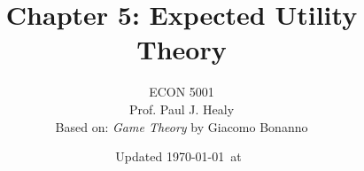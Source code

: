 

\title[Expected Utility]{Chapter 5: Expected Utility Theory}
\author[ECON 5001]{ECON 5001\\Prof. Paul J. Healy\\Based on: \textit{Game Theory} by Giacomo Bonanno} \color{metrop}
\institute[OSU]{}
\date[]{\vfill {\tiny Updated \today\ at\ \DTMcurrenttime}}

%
%

\newcommand{\riskpanel}[3]{%
  \draw[->] (7,0) -- (25.5,0) node[below] {\scriptsize \$};
  \draw[->] (7,0) -- (7,6.2) node[left] {\scriptsize $u$};
  \draw[blue, very thick, smooth, samples=80, domain=#2] plot (\x,{#1});
  \draw[thick] (10,1.64) -- (20,4.33);
  \foreach \d in {10,15,20}{
    \draw (\d,0.1) -- (\d,-0.1) node[below] {\scriptsize \d};
  }
  \draw[dotted, thick] (10,0) -- (10,1.64);
  \draw[dotted, thick] (20,0) -- (20,4.33);
  \draw[dotted, thick] (15,0) -- (15,#3);
  \draw[dotted, thick] (15,0) -- (15,2.985);
  \fill (10,1.64) circle (1.6pt);
  \fill (20,4.33) circle (1.6pt);
  \fill[red] (15,2.985) circle (2pt);
  \fill[blue] (15,#3) circle (2pt);
}



\frame{\maketitle}


